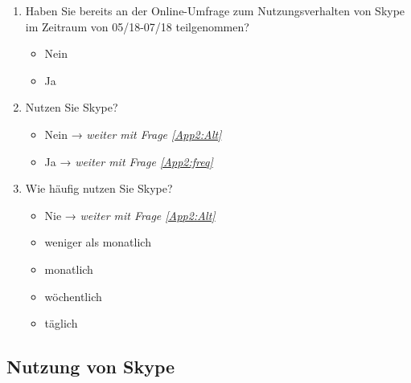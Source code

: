 \begin{enumerate}
\item Haben Sie bereits an der Online-Umfrage zum Nutzungsverhalten von Skype im Zeitraum von 05/18-07/18 teilgenommen?
		
        \begin{itemize}
		\item[\Circle] Nein
        \item[\Circle] Ja 
		\end{itemize}

\item Nutzen Sie Skype?
		
        \begin{itemize}
		\item[\Circle] Nein → \textit{weiter mit Frage \ref{App2:Alt}}
        \item[\Circle] Ja → \textit{weiter mit Frage \ref{App2:freq}}
		\end{itemize}

\pagebreak
\item  Wie häufig nutzen Sie Skype?\label{App2:freq}
		
        \begin{itemize}
		\item[\Circle] Nie → \textit{weiter mit Frage \ref{App2:Alt}}
        \item[\Circle] weniger als monatlich
        \item[\Circle] monatlich
        \item[\Circle] wöchentlich
        \item[\Circle] täglich
		\end{itemize}
\end{enumerate}
      

\subsection*{Nutzung von Skype}\largerpage

